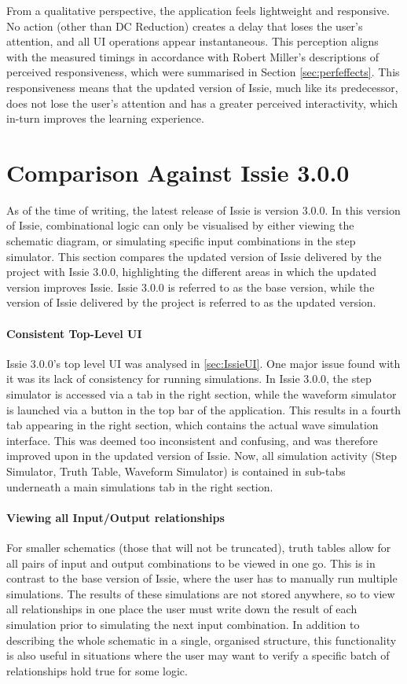 From a qualitative perspective, the application feels lightweight and responsive. No action (other than DC Reduction) creates a delay that loses the user's attention, and all UI operations appear instantaneous. This perception aligns with the measured timings in accordance with Robert Miller's descriptions of perceived responsiveness, which were summarised in Section \ref{sec:perfeffects}. This responsiveness means that the updated version of Issie, much like its predecessor, does not lose the user's attention and has a greater perceived interactivity, which in-turn improves the learning experience.

\section{Comparison Against Issie 3.0.0}
As of the time of writing, the latest release of Issie is version 3.0.0. In this version of Issie, combinational logic can only be visualised by either viewing the schematic diagram, or simulating specific input combinations in the step simulator. This section compares the updated version of Issie delivered by the project with Issie 3.0.0, highlighting the different areas in which the updated version improves Issie. Issie 3.0.0 is referred to as the base version, while the version of Issie delivered by the project is referred to as the updated version.

\paragraph{Consistent Top-Level UI} Issie 3.0.0's top level UI was analysed in \ref{sec:IssieUI}. One major issue found with it was its lack of consistency for running simulations. In Issie 3.0.0, the step simulator is accessed via a tab in the right section, while the waveform simulator is launched via a button in the top bar of the application. This results in a fourth tab appearing in the right section, which contains the actual wave simulation interface. This was deemed too inconsistent and confusing, and was therefore improved upon in the updated version of Issie. Now, all simulation activity (Step Simulator, Truth Table, Waveform Simulator) is contained in sub-tabs underneath a main simulations tab in the right section.

\paragraph{Viewing all Input/Output relationships} For smaller schematics (those that will not be truncated), truth tables allow for all pairs of input and output combinations to be viewed in one go. This is in contrast to the base version of Issie, where the user has to manually run multiple simulations. The results of these simulations are not stored anywhere, so to view all relationships in one place the user must write down the result of each simulation prior to simulating the next input combination. In addition to describing the whole schematic in a single, organised structure, this functionality is also useful in situations where the user may want to verify a specific batch of relationships hold true for some logic.

